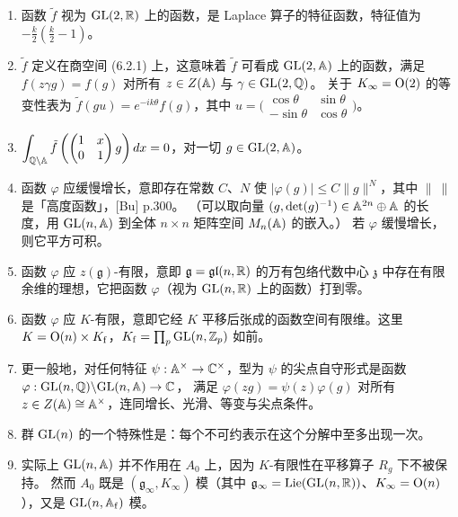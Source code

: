 \begin{enumerate}[label=\arabic*., leftmargin=1.9em, itemsep=1.2pt, topsep=2pt]
\[
\varphi\left(\begin{pmatrix}1&0\\0&a\end{pmatrix}g\right)\le C|a|^N
\]
只要 $a\in\bbA^{\times}$ 且 $|a|>c$；参看注 14。
\item 函数 $\tilde f$ 视为 $\mathrm{GL}(2,\mathbb{R})$ 上的函数，是 Laplace 算子的特征函数，特征值为 $-\frac{k}{2}\left(\frac{k}{2}-1\right)$。
\item $\tilde f$ 定义在商空间 (6.2.1) 上，这意味着 $\tilde f$ 可看成 $\mathrm{GL}(2,\mathbb{A})$ 上的函数，满足 $f(z\gamma g)=f(g)$ 对所有 $z\in Z(\mathbb{A})$ 与 $\gamma\in\mathrm{GL}(2,\mathbb{Q})$。
关于 $K_{\infty}=\mathrm{O}(2)$ 的等变性表为 $\tilde f(gu)=e^{-ik\theta}f(g)$，其中 $u=\bigl(\begin{smallmatrix}\cos\theta&\sin\theta\\-\sin\theta&\cos\theta\end{smallmatrix}\bigr)$。
\item $\displaystyle\int_{\mathbb{Q}\backslash\mathbb{A}}\tilde f\left(\begin{pmatrix}1&x\\0&1\end{pmatrix}g\right)dx=0$，对一切 $g\in\mathrm{GL}(2,\mathbb{A})$。
\item 函数 $\varphi$ 应缓慢增长，意即存在常数 $C$、$N$ 使 $|\varphi(g)|\le C\|g\|^N$，其中 $\|\ \|$ 是「高度函数」，[Bu] p.300。
（可以取向量 $(g,\det(g)^{-1})\in\mathbb{A}^{2n}\oplus\mathbb{A}$ 的长度，用 $\mathrm{GL}(n,\mathbb{A})$ 到全体 $n\times n$ 矩阵空间 $M_n(\mathbb{A})$ 的嵌入。）
若 $\varphi$ 缓慢增长，则它平方可积。
\item 函数 $\varphi$ 应 $z(\mathfrak g)$-有限，意即 $\mathfrak g=\mathfrak{gl}(n,\mathbb{R})$ 的万有包络代数中心 $\mathfrak z$ 中存在有限余维的理想，它把函数 $\varphi$（视为 $\mathrm{GL}(n,\mathbb{R})$ 上的函数）打到零。
\item 函数 $\varphi$ 应 $K$-有限，意即它经 $K$ 平移后张成的函数空间有限维。这里 $K=\mathrm{O}(n)\times K_{\mathrm f}$，$K_{\mathrm f}=\prod_p\mathrm{GL}(n,\mathbb{Z}_p)$ 如前。
\item 更一般地，对任何特征 $\psi:\mathbb{A}^{\times}\to\mathbb{C}^{\times}$，型为 $\psi$ 的尖点自守形式是函数 $\varphi:\mathrm{GL}(n,\mathbb{Q})\backslash\mathrm{GL}(n,\mathbb{A})\to\mathbb{C}$，
满足 $\varphi(zg)=\psi(z)\varphi(g)$ 对所有 $z\in Z(\mathbb{A})\cong\mathbb{A}^{\times}$，连同增长、光滑、等变与尖点条件。
\item 群 $\mathrm{GL}(n)$ 的一个特殊性是：每个不可约表示在这个分解中至多出现一次。
\item 实际上 $\mathrm{GL}(n,\mathbb{A})$ 并不作用在 $A_0$ 上，因为 $K$-有限性在平移算子 $R_g$ 下不被保持。
然而 $A_0$ 既是 $(\mathfrak g_{\infty},K_{\infty})$ 模（其中 $\mathfrak g_{\infty}=\mathrm{Lie}(\mathrm{GL}(n,\mathbb{R}))$、$K_{\infty}=\mathrm{O}(n)$），又是 $\mathrm{GL}(n,\mathbb{A}_{\mathrm f})$ 模。

\end{enumerate}
